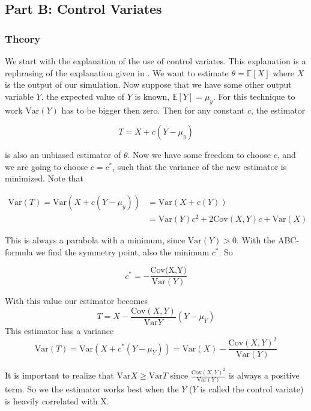 \documentclass[11pt,a4paper]{article}
\begin{document}
\subsection{Part B: Control Variates}

\subsubsection{Theory}
We start with the explanation of the use of control variates. This explanation is a rephrasing of the explanation given in \cite{ross}. We want to estimate $\theta=\mathbb{E}[X]$ where $X$ is the output of our simulation. Now suppose that we have some other output variable $Y$, the expected value of $Y$ is known, $\mathbb{E}[Y]=\mu_y$. For this technique to work $\text{Var}(Y)$ has to be bigger then zero. Then for any constant $c$, the estimator

\begin{equation}
\label{eq:controlvariate}
T=X+c(Y-\mu_y)
\end{equation}

is also an unbiased estimator of $\theta$. Now we have some freedom to choose $c$, and we are going to choose $c=c^*$, such that the variance of the new estimator is minimized. Note that

\begin{align}
\text{Var}(T)=\text{Var}(X+c(Y-\mu_y))&=\text{Var}(X+c(Y))\\
&=\text{Var}(Y)c^2+2\text{Cov}(X,Y)c+\text{Var}(X)
\end{align}

This is always a parabola with a minimum, since $\text{Var}(Y)>0$. With the ABC-formula we find the symmetry point, also the minimum $c^*$. So

\begin{equation}
c^*=-\frac{\text{Cov(X,Y)}}{\text{Var}(Y)}
\end{equation}

With this value our estimator becomes
\begin{equation}
T=X-\frac{\text{Cov}(X,Y)}{\text{Var}Y}(Y-\mu_Y)
\end{equation}
This estimator has a variance
\begin{equation}
\text{Var}(T)=\text{Var}(X+c^*(Y-\mu_Y))=\text{Var}(X)-\frac{\text{Cov}(X,Y)^2}{\text{Var}(Y)}
\end{equation}

It is important to realize that $\text{Var}X\geq\text{Var}T$ since $\frac{\text{Cov}(X,Y)^2}{\text{Var}(Y)}$ is always a positive term. So we the estimator works best when the $Y$ ($Y$ is called the control variate) is heavily correlated with X.
\end{document}
